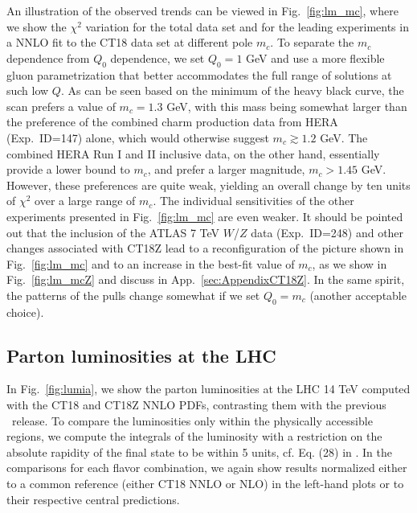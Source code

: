 An illustration of the observed trends can be viewed in
Fig.~\ref{fig:lm_mc}, where we show the $\chi^2$ variation for the
total data set and for the leading experiments in a NNLO fit to the
CT18 data set at different pole $m_c$. To separate the $m_c$ dependence from $Q_0$ dependence, we set $Q_0=1$ GeV and use a more flexible gluon parametrization that better accommodates the full range of solutions at such low $Q$. 
As can be seen based on the minimum of the heavy black curve, the scan prefers a value of $m_c\! =\! 1.3$ GeV, with this mass
being somewhat larger than the preference of the combined charm production data from HERA (Exp.~ID=147) alone, which would otherwise suggest
$m_c\!\gtrsim\!1.2$ GeV. The combined HERA Run I and II inclusive data, on the other hand, essentially provide a lower bound to $m_c$, and prefer
a larger magnitude, $m_c\! > \!1.45$ GeV. 
However, these preferences are quite weak, yielding an overall change by ten units of $\chi^2$ over a large range of $m_c$.
The individual sensitivities of the other experiments presented in Fig.~\ref{fig:lm_mc} are even weaker.
It should be pointed out that the inclusion of the ATLAS 7 TeV $W$/$Z$ data (Exp.~ID=248) and other changes associated with CT18Z lead to a reconfiguration of the picture shown in Fig.~\ref{fig:lm_mc} and to an increase in the best-fit value of $m_c$, as we show in Fig.~\ref{fig:lm_mcZ} and discuss in App.~\ref{sec:AppendixCT18Z}.
In the same spirit, the patterns of the pulls change somewhat if we set $Q_0=m_c$ (another acceptable choice). 


\subsection{Parton luminosities at the LHC
\label{sec:PDFLuminosities}
}

In Fig.~\ref{fig:lumia}, we show the parton luminosities
at the
LHC 14 TeV computed with the CT18 and CT18Z NNLO PDFs, contrasting them with
the previous \CTHERAII~release. To compare the luminosities only within the physically accessible regions, we compute the integrals of the luminosity with a restriction on the absolute rapidity of the final state to be
within 5 units, cf. Eq. (28) in \cite{Hou:2016sho}. In the comparisons for each
flavor combination, we again show results normalized either to a common reference 
(either CT18 NNLO or NLO) in the left-hand plots or to their respective central
predictions.

